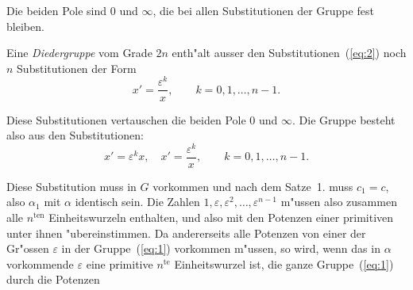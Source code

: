 \documentclass[12pt,a4paper]{article}
\theoremstyle{weber}
\begin{document}
Die beiden Pole sind $0$ und $\infty$, die bei allen Substitutionen der Gruppe fest bleiben.

Eine \textit{Diedergruppe} vom Grade $2n$ enth"alt ausser den Substitutionen~(\ref{eq:2}) noch $n$ Substitutionen der Form
\begin{equation}\label{eq:3}
x' = \frac{\varepsilon^k}{x},\qquad k = 0, 1, \ldots, n-1.
\end{equation}

Diese Substitutionen vertauschen die beiden Pole $0$ und $\infty$. Die Gruppe besteht also aus den Substitutionen:
\begin{equation}\label{eq:4}
x' = \varepsilon^k x,\quad x' = \frac{\varepsilon^k}{x},\qquad k = 0, 1, \ldots, n-1.
\end{equation}

Diese Substitution muss in $G$ vorkommen und nach dem Satze~1. muss $c_1 = c$, also $\alpha_1$ mit $\alpha$ identisch sein. Die Zahlen $1, \varepsilon, \varepsilon^2, \ldots, \varepsilon^{n-1}$ m"ussen also zusammen alle $n^{\text{ten}}$ Einheitswurzeln enthalten, und also mit den Potenzen einer primitiven unter ihnen "ubereinstimmen. Da andererseits alle Potenzen von einer der Gr"ossen $\varepsilon$ in der Gruppe~(\ref{eq:1}) vorkommen m"ussen, so wird, wenn das in $\alpha$ vorkommende $\varepsilon$ eine primitive $n^{\text{te}}$ Einheitswurzel ist, die ganze Gruppe~(\ref{eq:1}) durch die Potenzen
\end{document}

